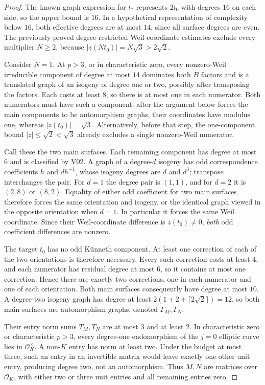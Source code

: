 \begin{proof}
The known graph expression for $t_*$ represents $2t_0$ with degrees
$16$ on each side, so the upper bound is $16$. In a hypothetical
representation of complexity below $16$, both effective degrees are
at most $14$, since all surface degrees are even. The previously proved
degree-restricted Weil-coordinate estimates exclude every multiplier
$N\geq2$, because $|z(Nt_0)|=N\sqrt3>2\sqrt2$.

Consider $N=1$. At $p>3$, or in characteristic zero, every
nonzero-Weil irreducible component of degree at most $14$ dominates
both $B$ factors and is a translated graph of an isogeny of degree one
or two, possibly after transposing the factors. Each costs at least
$8$, so there is at most one in each numerator. Both numerators must
have such a component: after the argument below forces the main
components to be automorphism graphs, their coordinates have modulus
one, whereas $|z(t_0)|=\sqrt3$. Alternatively, before that step,
the one-component bound $|z|\leq\sqrt2<\sqrt3$ already excludes a
single nonzero-Weil numerator.

Call these the two main surfaces. Each remaining component has degree
at most $6$ and is classified by V02. A graph of a degree-$d$ isogeny
has odd correspondence coefficients $h$ and $d h^{-1}$, whose isogeny
degrees are $d$ and $d^3$; transpose interchanges the pair. For $d=1$
the degree pair is $(1,1)$, and for $d=2$ it is $(2,8)$ or $(8,2)$.
Equality of either odd coefficient for two main surfaces therefore
forces the same orientation and isogeny, or the identical graph viewed
in the opposite orientation when $d=1$. In particular it forces the
same Weil coordinate. Since their Weil-coordinate difference is
$z(t_0)\ne0$, \emph{both} odd coefficient differences are nonzero.

The target $t_0$ has no odd K\"unneth component. At least one correction
of each of the two orientations is therefore necessary. Every such
correction costs at least $4$, and each numerator has residual degree
at most $6$, so it contains at most one correction. Hence there are
exactly two corrections, one in each numerator and one of each
orientation. Both main surfaces consequently have degree at most $10$.
A degree-two isogeny graph has degree at least
$2(1+2+\lceil2\sqrt2\rceil)=12$, so both main surfaces are
automorphism graphs, denoted $\Gamma_M,\Gamma_N$.

Their entry norm sums $T_M,T_N$ are at most $3$ and at least $2$.
In characteristic zero or characteristic $p>3$, every degree-one
endomorphism of the $j=0$ elliptic curve lies in $\mathcal O_K^\times$.
A non-$K$ entry has norm at least two. Under the budget at most three,
such an entry in an invertible matrix would leave exactly one other
unit entry, producing degree two, not an automorphism. Thus $M,N$ are
matrices over $\mathcal O_K$, with either two or three unit entries and
all remaining entries zero.


\end{proof}
